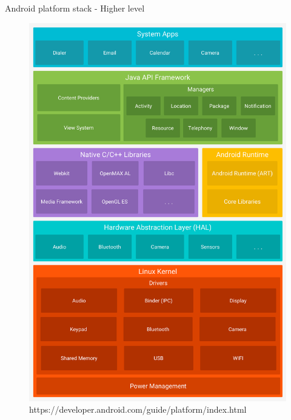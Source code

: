 \documentclass{beamer}
\begin{document}
  \begin{frame}{Android platform stack - Higher level}
    \begin{center}
        \begin{figure}
            \includegraphics[clip, trim=0 36cm 0 0, width=.8\paperwidth]{android-stack}
            \caption{https://developer.android.com/guide/platform/index.html}
        \end{figure}
    \end{center}
\end{frame}
\end{document}
